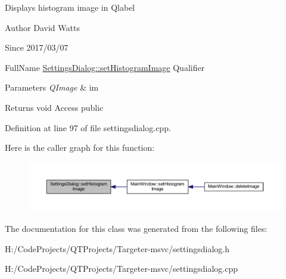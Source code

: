 Displays histogram image in Qlabel

\begin{DoxyAuthor}{Author}
David Watts 
\end{DoxyAuthor}
\begin{DoxySince}{Since}
2017/03/07
\end{DoxySince}
Full\+Name \hyperlink{class_settings_dialog_a3a730a1d975d4c349fe2a4ed01267735}{Settings\+Dialog\+::set\+Histogram\+Image} Qualifier 
\begin{DoxyParams}{Parameters}
{\em Q\+Image} & im \\
\hline
\end{DoxyParams}
\begin{DoxyReturn}{Returns}
void Access public 
\end{DoxyReturn}


Definition at line 97 of file settingsdialog.\+cpp.

Here is the caller graph for this function\+:
\nopagebreak
\begin{figure}[H]
\begin{center}
\leavevmode
\includegraphics[width=350pt]{class_settings_dialog_a3a730a1d975d4c349fe2a4ed01267735_icgraph}
\end{center}
\end{figure}


The documentation for this class was generated from the following files\+:\begin{DoxyCompactItemize}
\item 
H\+:/\+Code\+Projects/\+Q\+T\+Projects/\+Targeter-\/msvc/settingsdialog.\+h\item 
H\+:/\+Code\+Projects/\+Q\+T\+Projects/\+Targeter-\/msvc/settingsdialog.\+cpp\end{DoxyCompactItemize}
